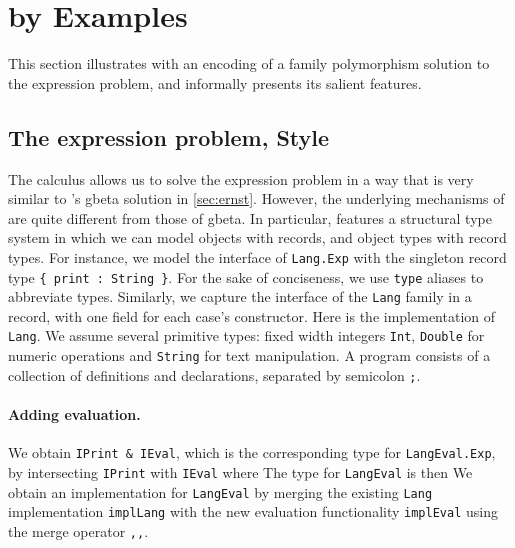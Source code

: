 
\section{\namee by Examples}
\label{nested:sec:overview}

This section illustrates \namee with an encoding of a family polymorphism
solution to the expression problem, and informally presents its salient
features.


\subsection{The expression problem, \namee Style}

The \namee calculus allows us to solve the expression problem in a way that is
very similar to \citeauthor{Ernst_2001}'s \textsf{gbeta} solution in \cref{sec:ernst}.
However, the underlying mechanisms of \namee are quite different from those of
\textsf{gbeta}. In particular, \namee features a structural type system in which we can
model objects with records, and object types with record types. For instance, we
model the interface of \lstinline{Lang.Exp} with the singleton record type
\lstinline${ print : String }$. For the sake of conciseness, we use \lstinline{type} aliases
to abbreviate types.
Similarly, we capture the interface of the \lstinline{Lang} family in a record,
with one field for each case's constructor.
Here is the implementation of \lstinline{Lang}.
We assume several primitive types: fixed width integers \lstinline{Int},
\lstinline{Double} for numeric operations and \lstinline{String} for text
manipulation. A \namee program consists of a collection of definitions and
declarations, separated by semicolon \lstinline{;}.

\paragraph{Adding evaluation.}
We obtain \lstinline{IPrint & IEval}, which is the corresponding type for \lstinline{LangEval.Exp}, by
intersecting \lstinline{IPrint} with \lstinline{IEval} where
The type for \lstinline{LangEval} is then
We obtain an implementation for \lstinline{LangEval} by merging the existing
\lstinline{Lang} implementation \lstinline{implLang} with the new evaluation
functionality \lstinline{implEval} using the merge operator \lstinline{,,}.

